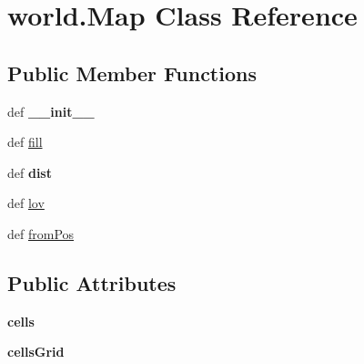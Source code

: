 \hypertarget{classworld_1_1_map}{\section{world.\-Map \-Class \-Reference}
\label{classworld_1_1_map}
}
\subsection*{\-Public \-Member \-Functions}
\begin{DoxyCompactItemize}
\item 
\hypertarget{classworld_1_1_map_aabfde95675f6b82d9a8afcd676053632}{def {\bfseries \-\_\-\-\_\-init\-\_\-\-\_\-}}\label{classworld_1_1_map_aabfde95675f6b82d9a8afcd676053632}

\item 
def \hyperlink{classworld_1_1_map_ac8e650b696f537d9df20ee5d2243e978}{fill}
\item 
\hypertarget{classworld_1_1_map_ac5f255ae58db6b391d0a3d5807365370}{def {\bfseries dist}}\label{classworld_1_1_map_ac5f255ae58db6b391d0a3d5807365370}

\item 
def \hyperlink{classworld_1_1_map_a7b1d3e4419fd5bd48d5f759e63ae55f5}{lov}
\item 
def \hyperlink{classworld_1_1_map_a12e89884cc3e9da4d024575a85b1d324}{from\-Pos}
\end{DoxyCompactItemize}
\subsection*{\-Public \-Attributes}
\begin{DoxyCompactItemize}
\item 
\hypertarget{classworld_1_1_map_af412cfb2a5b25f4ca3188498f916a647}{{\bfseries cells}}\label{classworld_1_1_map_af412cfb2a5b25f4ca3188498f916a647}

\item 
\hypertarget{classworld_1_1_map_aec6e18657e8d65b1ab57cdf305e2de37}{{\bfseries cells\-Grid}}\label{classworld_1_1_map_aec6e18657e8d65b1ab57cdf305e2de37}

\end{DoxyCompactItemize}


